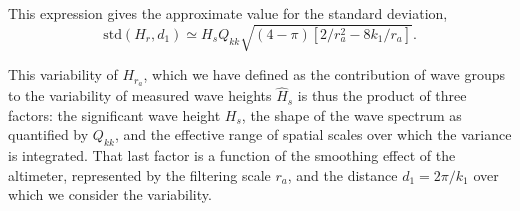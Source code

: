 {This expression gives the approximate value for the standard deviation,
\begin{equation}
    \mathrm{std}(H_{r},d_1) \simeq  H_s   Q_{kk}  \sqrt{ (4-\pi) \left[2/r_a^2 -  8 k_1 / r_a\right] }.\label{eq:Lambda2}
\end{equation}

{This variability of $H_{r_a}$, which we have defined as the contribution of wave groups to the variability of measured wave heights $\widehat{H}_s$ is thus the product of three factors: the significant wave height $H_s$, the shape of the wave spectrum as quantified by $Q_{kk}$, and the effective range of spatial scales over which the variance is integrated. That last factor is a function of the smoothing effect of the altimeter, represented by the filtering scale $r_a$, and the distance $d_1=2\pi / k_1$ over which  we consider the variability.


}}
